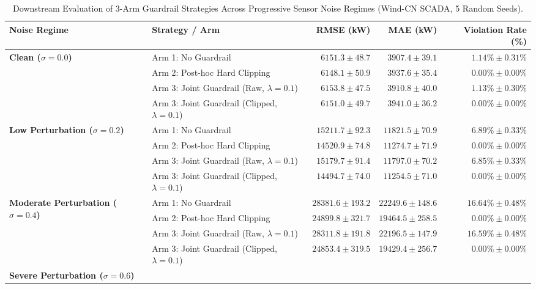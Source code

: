 \documentclass[preprint,3p,times]{elsarticle}
\begin{document}
\begin{table}[t]
\centering
\small
\begin{threeparttable}
\caption{Downstream Evaluation of 3-Arm Guardrail Strategies Across Progressive Sensor Noise Regimes (Wind-CN SCADA, 5 Random Seeds).}
\label{tab:guardrail_results}
\begin{tabular}{llrrr}
\toprule
\textbf{Noise Regime} & \textbf{Strategy / Arm} & \textbf{RMSE (kW)} & \textbf{MAE (kW)} & \textbf{Violation Rate (\%)} \\
\midrule
\multirow{4}{*}{\textbf{Clean ($\sigma = 0.0$)}} 
& Arm 1: No Guardrail & $6151.3 \pm 48.7$ & $3907.4 \pm 39.1$ & $1.14\% \pm 0.31\%$ \\
& Arm 2: Post-hoc Hard Clipping & $\mathbf{6148.1 \pm 50.9}$ & $3937.6 \pm 35.4$ & $\mathbf{0.00\% \pm 0.00\%}$ \\
& Arm 3: Joint Guardrail (Raw, $\lambda=0.1$) & $6153.8 \pm 47.5$ & $3910.8 \pm 40.0$ & $1.13\% \pm 0.30\%$ \\
& Arm 3: Joint Guardrail (Clipped, $\lambda=0.1$) & $6151.0 \pm 49.7$ & $3941.0 \pm 36.2$ & $\mathbf{0.00\% \pm 0.00\%}$ \\
\midrule
\multirow{4}{*}{\textbf{Low Perturbation ($\sigma = 0.2$)}} 
& Arm 1: No Guardrail & $15211.7 \pm 92.3$ & $11821.5 \pm 70.9$ & $6.89\% \pm 0.33\%$ \\
& Arm 2: Post-hoc Hard Clipping & $14520.9 \pm 74.8$ & $11274.7 \pm 71.9$ & $\mathbf{0.00\% \pm 0.00\%}$ \\
& Arm 3: Joint Guardrail (Raw, $\lambda=0.1$) & $15179.7 \pm 91.4$ & $11797.0 \pm 70.2$ & $6.85\% \pm 0.33\%$ \\
& Arm 3: Joint Guardrail (Clipped, $\lambda=0.1$) & $\mathbf{14494.7 \pm 74.0}$ & $\mathbf{11254.5 \pm 71.0}$ & $\mathbf{0.00\% \pm 0.00\%}$ \\
\midrule
\multirow{4}{*}{\textbf{Moderate Perturbation ($\sigma = 0.4$)}} 
& Arm 1: No Guardrail & $28381.6 \pm 193.2$ & $22249.6 \pm 148.6$ & $16.64\% \pm 0.48\%$ \\
& Arm 2: Post-hoc Hard Clipping & $24899.8 \pm 321.7$ & $19464.5 \pm 258.5$ & $\mathbf{0.00\% \pm 0.00\%}$ \\
& Arm 3: Joint Guardrail (Raw, $\lambda=0.1$) & $28311.8 \pm 191.8$ & $22196.5 \pm 147.9$ & $16.59\% \pm 0.48\%$ \\
& Arm 3: Joint Guardrail (Clipped, $\lambda=0.1$) & $\mathbf{24853.4 \pm 319.5}$ & $\mathbf{19429.4 \pm 256.7}$ & $\mathbf{0.00\% \pm 0.00\%}$ \\
\midrule
\multirow{4}{*}{\textbf{Severe Perturbation ($\sigma = 0.6$)}} 

\end{tabular}
\end{threeparttable}
\end{table}
\end{document}
